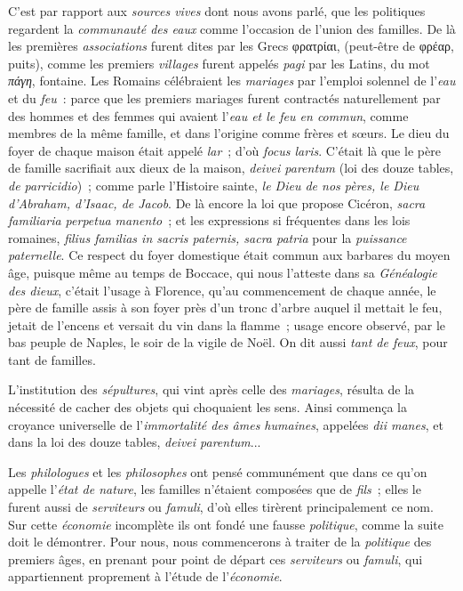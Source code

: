 \documentclass[french,twoside]{book} %
\begin{document}
C’est par rapport aux {\itshape sources vives} dont nous avons parlé, que les politiques regardent la {\itshape communauté des eaux} comme l’occasion de l’union des familles. De là les premières {\itshape associations} furent dites par les Grecs φρατρίαι, (peut-être de φρέαρ, puits), comme les premiers {\itshape villages} furent appelés {\itshape pagi} par les Latins, du mot {\itshape πάγη}, fontaine. Les Romains célébraient les {\itshape mariages} par l’emploi  solennel de l’{\itshape eau} et du {\itshape feu} : parce que les premiers mariages furent contractés naturellement par des hommes et des femmes qui avaient l’{\itshape eau et le feu en commun}, comme membres de la même famille, et dans l’origine comme frères et sœurs. Le dieu du foyer de chaque maison était appelé {\itshape lar} ; d’où {\itshape focus laris}. C’était là que le père de famille sacrifiait aux dieux de la maison, \emph{{\itshape deivei parentum}} (loi des douze tables, {\itshape de parricidio}) ; comme parle l’Histoire sainte, \emph{{\itshape le Dieu de nos pères, le Dieu d’Abraham, d’Isaac, de Jacob}}. De là encore la loi que propose Cicéron, \emph{{\itshape sacra familiaria perpetua manento}} ; et les expressions si fréquentes dans les lois romaines, {\itshape filius familias in sacris paternis, sacra patria} pour la {\itshape puissance paternelle}. Ce respect du foyer domestique était commun aux barbares du moyen âge, puisque même au temps de Boccace, qui nous l’atteste dans sa {\itshape Généalogie des dieux}, c’était l’usage à Florence, qu’au commencement de chaque année, le père de famille assis à son foyer près d’un tronc d’arbre auquel il mettait le feu, jetait de l’encens et versait du vin dans la flamme ; usage encore observé, par le bas peuple de Naples, le soir de la vigile de Noël. On dit aussi {\itshape tant de feux}, pour tant de familles.\par
\par
L’institution des {\itshape sépultures}, qui vint après celle des {\itshape mariages}, résulta de la nécessité de cacher des objets qui choquaient les sens. Ainsi commença la croyance universelle de l’{\itshape immortalité des âmes humaines},  appelées {\itshape dii manes}, et dans la loi des douze tables, {\itshape deivei parentum}...\par
Les {\itshape philologues} et les {\itshape philosophes} ont pensé communément que dans ce qu’on appelle l’{\itshape état de nature}, les familles n’étaient composées que de {\itshape fils} ; elles le furent aussi de {\itshape serviteurs} ou {\itshape famuli}, d’où elles tirèrent principalement ce nom. Sur cette {\itshape économie} incomplète ils ont fondé une fausse {\itshape politique}, comme la suite doit le démontrer. Pour nous, nous commencerons à traiter de la {\itshape politique} des premiers âges, en prenant pour point de départ ces {\itshape serviteurs} ou {\itshape famuli}, qui appartiennent proprement à l’étude de l’{\itshape économie}.
\end{document}
